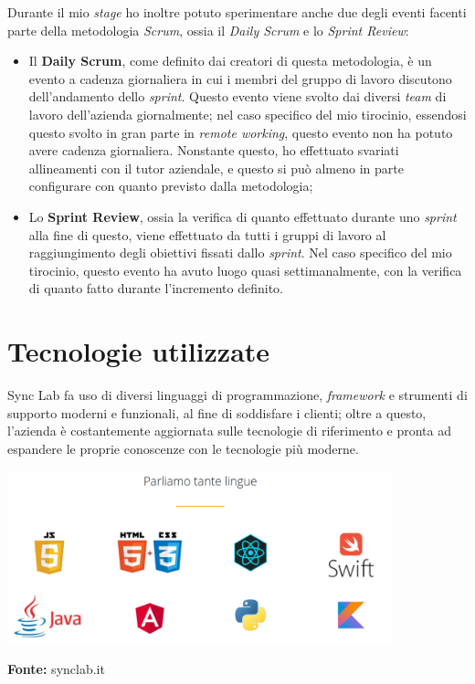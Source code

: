 Durante il mio \textit{stage} ho inoltre potuto sperimentare anche due degli eventi facenti parte della metodologia \textit{Scrum}, ossia il \textit{Daily Scrum} e lo \textit{Sprint Review}:
\begin{itemize}
  \item Il \textbf{Daily Scrum}, come definito dai creatori di questa metodologia, è un evento a cadenza giornaliera in cui i membri del gruppo di lavoro discutono dell'andamento dello \textit{sprint}. Questo evento viene svolto dai diversi \textit{team} di lavoro dell'azienda giornalmente; nel caso specifico del mio tirocinio, essendosi questo svolto in gran parte in \textit{remote working}, questo evento non ha potuto avere cadenza giornaliera. Nonstante questo, ho effettuato svariati allineamenti con il tutor aziendale, e questo si può almeno in parte configurare con quanto previsto dalla metodologia;
  \item Lo \textbf{Sprint Review}, ossia la verifica di quanto effettuato durante uno \textit{sprint} alla fine di questo, viene effettuato da tutti i gruppi di lavoro al raggiungimento degli obiettivi fissati dallo \textit{sprint}. Nel caso specifico del mio tirocinio, questo evento ha avuto luogo quasi settimanalmente, con la verifica di quanto fatto durante l'incremento definito.
\end{itemize}


\section{Tecnologie utilizzate}

Sync Lab fa uso di diversi linguaggi di programmazione, \textit{framework} e strumenti di supporto moderni e funzionali, al fine di soddisfare i clienti; oltre a questo, l'azienda è costantemente aggiornata sulle tecnologie di riferimento e pronta ad espandere le proprie conoscenze con le tecnologie più moderne. \\

\begin{minipage}{\linewidth}
  \centering
    \includegraphics[height=5cm]{immagini/linguaggi}
  \caption*{\textbf{Fonte:} synclab.it}
\end{minipage} \newpage

